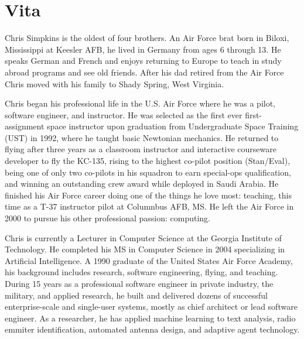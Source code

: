 \chapter*{Vita}


Chris Simpkins is the oldest of four brothers. An Air Force brat born in Biloxi, Mississippi at Keesler AFB, he lived in Germany from ages 6 through 13. He speaks German and French and enjoys returning to Europe to teach in study abroad programs and see old friends. After his dad retired from the Air Force Chris moved with his family to Shady Spring, West Virginia.

Chris began his professional life in the U.S. Air Force where he was a pilot, software engineer, and instructor. He was selected as the first ever first-assignment space instructor upon graduation from Undergraduate Space Training (UST) in 1992, where he taught basic Newtonian mechanics. He returned to flying after three years as a classroom instructor and interactive courseware developer to fly the KC-135, rising to the highest co-pilot position (Stan/Eval), being one of only two co-pilots in his squadron to earn special-ops qualification, and winning an outstanding crew award while deployed in Saudi Arabia. He finished his Air Force career doing one of the things he love most: teaching, this time as a T-37 instructor pilot at Columnbus AFB, MS. He left the Air Force in 2000 to pursue his other professional passion: computing.

Chris is currently a Lecturer in Computer Science at the Georgia Institute of Technology. He completed his MS in Computer Science in 2004 specializing in Artificial Intelligence. A 1990 graduate of the United States Air Force Academy, his background includes research, software engineering, flying, and teaching. During 15 years as a professional software engineer in private industry, the military, and applied research, he built and delivered dozens of successful enterprise-scale and single-user systems, mostly as chief architect or lead software engineer. As a researcher, he has applied machine learning to text analysis, radio emmiter identification, automated antenna design, and adaptive agent technology.
